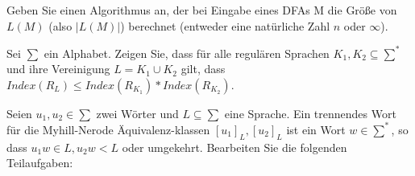 \documentclass[10pt, a4paper]{exam}
\begin{document}
\begin{questions}

    \question Geben Sie einen Algorithmus an, der bei Eingabe eines DFAs M die Größe von $L(M)$ (also $|L(M)|$) berechnet (entweder eine natürliche Zahl $n$ oder $\infty$).
    \begin{solution}
    \end{solution}

    \question Sei $\sum$ ein Alphabet. Zeigen Sie, dass für alle regulären Sprachen $K_1,K_2\subseteq\sum^*$ und ihre Vereinigung $L=K_1\cup K_2$ gilt, dass $Index(R_L)\leq Index(R_{K_1})* Index(R_{K_2})$.
    \begin{solution}
    \end{solution}

    \question Seien $u_1, u_2\in\sum$ zwei Wörter und $L\subseteq\sum$ eine Sprache. Ein trennendes Wort für die Myhill-Nerode Äquivalenz-klassen  $[u_1]_L, [u_2]_L$ ist ein Wort $w\in\sum^*$, so dass $u_1 w\in L, u_2w < L$ oder umgekehrt. Bearbeiten Sie die folgenden Teilaufgaben:


\end{questions}
\end{document}
